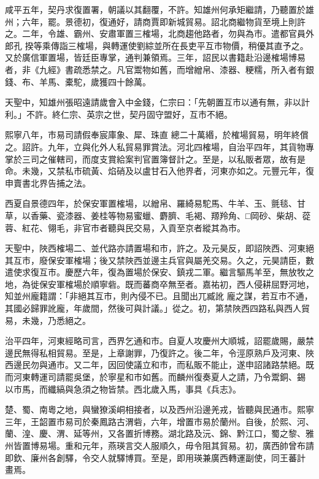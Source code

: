 \begin{pinyinscope}
 咸平五年，契丹求復置署，朝議以其翻覆，不許。知雄州何承矩繼請，乃聽置於雄州；六年，罷。景德初，復通好，請商賈即新城貿易。詔北商繼物貨至境上則許之。二年，令雄、霸州、安肅軍置三榷場，北商趨他路者，勿與為市。遣都官員外郎孔
 揆等乘傳詣三榷場，與轉運使劉綜並所在長吏平互市物價，稍優其直予之。又於廣信軍置場，皆廷臣專掌，通判兼領焉。三年，詔民以書籍赴沿邊榷場博易者，非《九經》書疏悉禁之。凡官鬻物如舊，而增繒帛、漆器、粳糯，所入者有銀錢、布、羊馬、橐駝，歲獲四十餘萬。



 天聖中，知雄州張昭遠請歲會入中金錢，仁宗曰：「先朝置互市以通有無，非以計利。」不許。終仁宗、英宗之世，契丹固守盟好，互市不絕。



 熙寧八年，市易司請假奉宸庫象、犀、珠直
 總二十萬緡，於榷場貿易，明年終償之。詔許。九年，立與化外人私貿易罪賞法。河北四榷場，自治平四年，其貨物專掌於三司之催轄司，而度支賞給案判官置簿督計之。至是，以私販者眾，故有是命。未幾，又禁私市硫黃、焰硝及以盧甘石入他界者，河東亦如之。元豐元年，復申賣書北界告捕之法。



 西夏自景德四年，於保安軍置榷場，以繒帛、羅綺易駝馬、牛羊、玉、氈毯、甘草，以香藥、瓷漆器、姜桂等物易蜜蠟、麝臍、毛褐、羱羚角、□岡砂、柴胡、蓯
 蓉、紅花、翎毛，非官市者聽與民交易，入貢至京者縱其為市。



 天聖中，陜西榷場二、並代路亦請置場和市，許之。及元昊反，即詔陜西、河東絕其互市，廢保安軍榷場；後又禁陜西並邊主兵官與屬羌交易。久之，元昊請臣，數遣使求復互市。慶歷六年，復為置場於保安、鎮戎二軍。繼言驅馬羊至，無放牧之地，為徙保安軍榷場於順寧砦。既而蕃商卒無至者。嘉祐初，西人侵耕屈野河地，知並州龐籍謂：「非絕其互市，則內侵不已。且聞出兀臧訛
 龐之謀，若互市不通，其國必歸罪訛龐，年歲間，然後可與計議。」從之。初，第禁陜西四路私與西人貿易，未幾，乃悉絕之。



 治平四年，河東經略司言，西界乞通和市。自夏人攻慶州大順城，詔罷歲賜，嚴禁邊民無得私相貿易。至是，上章謝罪，乃復許之。後二年，令涇原熟戶及河東、陜西邊民勿與通市。又二年，因回使議立和市，而私販不能止，遂申詔諸路禁絕。既而河東轉運司請罷吳堡，於寧星和市如舊。而麟州復奏夏人之請，乃令鬻銅、錫
 以市馬，而纖縞與急須之物皆禁。西北歲入馬，事具《兵志》。



 楚、蜀、南粵之地，與蠻獠溪峒相接者，以及西州沿邊羌戎，皆聽與民通市。熙寧三年，王韶置市易司於秦鳳路古渭砦，六年，增置市易於蘭州。自後，於熙、河、蘭、湟、慶、渭、延等州，又各置折博務。湖北路及沅、錦、黔江口，蜀之黎、雅州皆置博易場。重和元年，燕瑛言交人服順久，毋令阻其貿易。初，廣西帥曾布請即欽、廉州各創驛，令交人就驛博買。至是，即用瑛兼廣西轉運副使，同王蕃計
 畫焉。




\end{pinyinscope}
